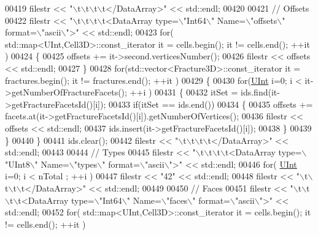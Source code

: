 \begin{DoxyCode}
00419     filestr << \textcolor{stringliteral}{"\(\backslash\)t\(\backslash\)t\(\backslash\)t\(\backslash\)t</DataArray>"} << std::endl;
00420 
00421     \textcolor{comment}{//  Offsets}
00422     filestr << \textcolor{stringliteral}{"\(\backslash\)t\(\backslash\)t\(\backslash\)t\(\backslash\)t<DataArray type=\(\backslash\)"Int64\(\backslash\)" Name=\(\backslash\)"offsets\(\backslash\)" format=\(\backslash\)"ascii\(\backslash\)">"} << std::endl;
00423     \textcolor{keywordflow}{for}( std::map<UInt,Cell3D>::const\_iterator it = cells.begin(); it != cells.end(); ++it )
00424     \{
00425         offsets += it->second.verticesNumber();
00426         filestr << offsets << std::endl;
00427     \}
00428     \textcolor{keywordflow}{for}(std::vector<Fracture3D>::const\_iterator it = fractures.begin(); it != fractures.end(); ++it )
00429     \{
00430         \textcolor{keywordflow}{for}(\hyperlink{namespaceFVCode3D_a4bf7e328c75d0fd504050d040ebe9eda}{UInt} i=0; i < it->getNumberOfFractureFacets(); ++i )
00431         \{
00432             itSet = ids.find(it->getFractureFacetsId()[i]);
00433             \textcolor{keywordflow}{if}(itSet == ids.end())
00434             \{
00435                 offsets += facets.at(it->getFractureFacetsId()[i]).getNumberOfVertices();
00436                 filestr << offsets << std::endl;
00437                 ids.insert(it->getFractureFacetsId()[i]);
00438             \}
00439         \}
00440     \}
00441     ids.clear();
00442     filestr << \textcolor{stringliteral}{"\(\backslash\)t\(\backslash\)t\(\backslash\)t\(\backslash\)t</DataArray>"} << std::endl;
00443 
00444     \textcolor{comment}{//  Types}
00445     filestr << \textcolor{stringliteral}{"\(\backslash\)t\(\backslash\)t\(\backslash\)t\(\backslash\)t<DataArray type=\(\backslash\)"UInt8\(\backslash\)" Name=\(\backslash\)"types\(\backslash\)" format=\(\backslash\)"ascii\(\backslash\)">"} << std::endl;
00446     \textcolor{keywordflow}{for}( \hyperlink{namespaceFVCode3D_a4bf7e328c75d0fd504050d040ebe9eda}{UInt} i=0; i < nTotal ; ++i )
00447         filestr << \textcolor{stringliteral}{"42"} << std::endl;
00448     filestr << \textcolor{stringliteral}{"\(\backslash\)t\(\backslash\)t\(\backslash\)t\(\backslash\)t</DataArray>"} << std::endl;
00449 
00450     \textcolor{comment}{//  Faces}
00451     filestr << \textcolor{stringliteral}{"\(\backslash\)t\(\backslash\)t\(\backslash\)t\(\backslash\)t<DataArray type=\(\backslash\)"Int64\(\backslash\)" Name=\(\backslash\)"faces\(\backslash\)" format=\(\backslash\)"ascii\(\backslash\)">"} << std::endl;
00452     \textcolor{keywordflow}{for}( std::map<UInt,Cell3D>::const\_iterator it = cells.begin(); it != cells.end(); ++it )

\end{DoxyCode}
